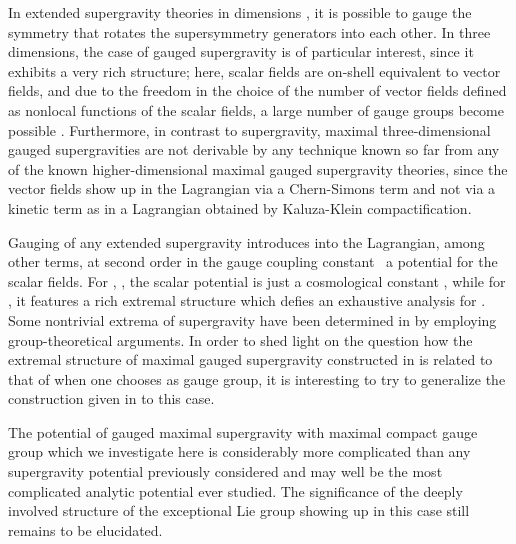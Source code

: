 \documentclass[a4paper,12pt]{article}
\begin{document}
In \coordHE{} extended supergravity theories in dimensions \coordHE{}, it is
possible to gauge the \coordHE{} symmetry that rotates the supersymmetry
generators into each other. In three dimensions, the case of gauged
\coordHE{} supergravity is of particular interest, since it exhibits a
very rich structure; here, scalar fields are on-shell equivalent to
vector fields, and due to the freedom in the choice of the number of
vector fields defined as nonlocal functions of the scalar fields, a
large number of gauge groups become possible
\cite{Nicolai:2000sc, Nicolai:2001sv}. Furthermore, in contrast to
\coordHE{} supergravity, maximal three-dimensional gauged supergravities
are not derivable by any technique known so far from any of the known
higher-dimensional maximal gauged supergravity theories, since the
vector fields show up in the Lagrangian via a Chern-Simons term and
not via a kinetic term as in a Lagrangian obtained by Kaluza-Klein
compactification.

Gauging of any extended supergravity introduces into the Lagrangian,
among other terms, at second order in the gauge coupling constant~\coordHE{}
a potential for the scalar fields. For \coordHE{}, \coordHE{}, the scalar
potential is just a cosmological constant \coordHE{}, while for \coordHE{}, it features a rich extremal structure which defies
an exhaustive analysis for \coordHE{}. Some nontrivial extrema of \coordHE{}
supergravity have been determined in
\cite{Warner:du, Warner:vz} by employing group-theoretical arguments.
In order to shed light on the question how the extremal structure of
maximal gauged \coordHE{} supergravity constructed in
\cite{Nicolai:2000sc, Nicolai:2001sv} is related to that of \coordHE{}
when one chooses \coordHE{} as gauge group, it is interesting
to try to generalize the construction given in \cite{Warner:vz} to
this case.

The potential of gauged maximal \coordHE{} supergravity with maximal
compact \coordHE{} gauge group which we investigate here is
considerably more complicated than any supergravity potential
previously considered and may well be the most complicated analytic
potential ever studied. The significance of the deeply involved
structure of the exceptional Lie group \coordHE{} showing up in this case
still remains to be elucidated.
\end{document}
